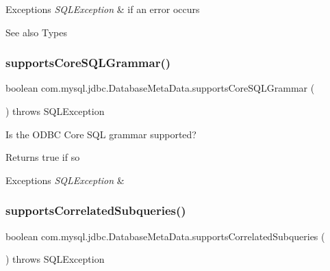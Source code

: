 \begin{DoxyExceptions}{Exceptions}
{\em S\+Q\+L\+Exception} & if an error occurs \\
\hline
\end{DoxyExceptions}
\begin{DoxySeeAlso}{See also}
Types 
\end{DoxySeeAlso}
\mbox{\label{classcom_1_1mysql_1_1jdbc_1_1_database_meta_data_a6a2aec234d45f2754fe87e58ffb0ddef}} 
\subsubsection{\texorpdfstring{supports\+Core\+S\+Q\+L\+Grammar()}{supportsCoreSQLGrammar()}}
{\footnotesize\ttfamily boolean com.\+mysql.\+jdbc.\+Database\+Meta\+Data.\+supports\+Core\+S\+Q\+L\+Grammar (\begin{DoxyParamCaption}{ }\end{DoxyParamCaption}) throws S\+Q\+L\+Exception}

Is the O\+D\+BC Core S\+QL grammar supported?

\begin{DoxyReturn}{Returns}
true if so 
\end{DoxyReturn}

\begin{DoxyExceptions}{Exceptions}
{\em S\+Q\+L\+Exception} & \\
\hline
\end{DoxyExceptions}
\mbox{\label{classcom_1_1mysql_1_1jdbc_1_1_database_meta_data_ac2e45eb8d0befb92a37a71a20d9cde24}} 
\subsubsection{\texorpdfstring{supports\+Correlated\+Subqueries()}{supportsCorrelatedSubqueries()}}
{\footnotesize\ttfamily boolean com.\+mysql.\+jdbc.\+Database\+Meta\+Data.\+supports\+Correlated\+Subqueries (\begin{DoxyParamCaption}{ }\end{DoxyParamCaption}) throws S\+Q\+L\+Exception}

